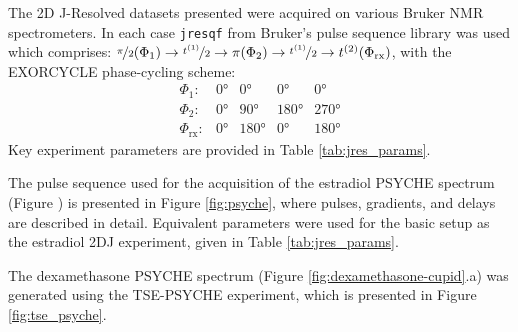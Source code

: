 The 2D J-Resolved datasets presented were acquired on various Bruker NMR
spectrometers. In each case \texttt{jresqf} from Bruker's pulse sequence
library was used which comprises:
 $\nicefrac{\pi}{2}(\Phi_1) \rightarrow \nicefrac{t^{(1)}}{2} \rightarrow
\pi(\Phi_{2}) \rightarrow \nicefrac{t^{(1)}}{2} \rightarrow t^{(2)}(\Phi_{\text{rx}})$, with
the EXORCYCLE phase-cycling scheme\cite[Section 11.6]{Keeler2010}:
\begin{equation*}
    \begin{array}{lllll}
        \Phi_{1}: & \ang{0} & \ang{0} & \ang{0} & \ang{0} \\
        \Phi_{2}: & \ang{0} & \ang{90} & \ang{180} & \ang{270} \\
        \Phi_{\text{rx}}: & \ang{0} & \ang{180} & \ang{0} & \ang{180}
    \end{array}
\end{equation*}
Key experiment parameters are provided in Table \ref{tab:jres_params}.

The pulse sequence used for the acquisition of the estradiol \ac{PSYCHE}
spectrum (Figure ) is presented in Figure \ref{fig:psyche}, where
pulses, gradients, and delays are described in detail. Equivalent parameters
were used for the basic setup as the estradiol 2DJ experiment, given in Table
\ref{tab:jres_params}.

The dexamethasone \ac{PSYCHE} spectrum (Figure \ref{fig:dexamethasone-cupid}.a)
was generated using the \ac{TSE-PSYCHE} experiment, which is presented in
Figure \ref{fig:tse_psyche}.



